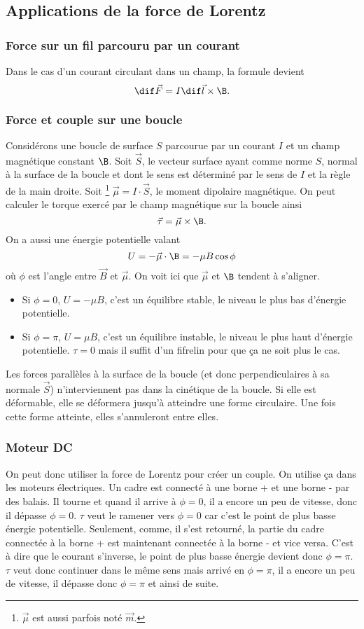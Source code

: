 \subsection{Applications de la force de Lorentz}
\subsubsection{Force sur un fil parcouru par un courant}
Dans le cas d'un courant circulant dans un champ, la formule devient
\[ \dif \vec F = I\dif \vec l \times \B. \]

\subsubsection{Force et couple sur une boucle}
Considérons une boucle de surface $S$ parcourue par un courant $I$
et un champ magnétique constant $\B$.
Soit $\vec S$, le vecteur surface ayant comme norme $S$,
normal à la surface de la boucle et dont le sens est déterminé
par le sens de $I$ et la règle de la main droite.
Soit
\footnote{$\vec \mu$ est aussi parfois noté $\vec m$.}
$\vec \mu = I \cdot \vec S$,
le moment dipolaire magnétique.
On peut calculer le torque exercé par le champ magnétique sur la boucle ainsi
\[ \vec \tau = \vec \mu \times \B. \]
On a aussi une énergie potentielle valant
\[ U = -\vec \mu \cdot \B = -\mu B \cos \phi \]
où $\phi$ est l'angle entre $\vec{B}$ et $\vec{\mu}$.
On voit ici que $\vec \mu$ et $\B$ tendent à s'aligner.
\begin{itemize}
  \item Si $\phi = 0$, $U = - \mu B$, c'est un équilibre stable,
    le niveau le plus bas d'énergie potentielle.
  \item Si $\phi = \pi$, $U = \mu B$, c'est un équilibre instable,
    le niveau le plus haut d'énergie potentielle.
    $\tau = 0$ mais il suffit d'un fifrelin pour que ça ne soit plus le cas.
\end{itemize}

Les forces parallèles à la surface de la boucle
(et donc perpendiculaires à sa normale $\vec{S}$) n'interviennent pas
dans la cinétique de la boucle.
Si elle est déformable,
elle se déformera jusqu'à atteindre une forme circulaire.
Une fois cette forme atteinte, elles s'annuleront entre elles.

\subsubsection{Moteur DC}
On peut donc utiliser la force de Lorentz pour créer un couple.
On utilise ça dans les moteurs électriques.
Un cadre est connecté à une borne + et une borne - par des balais.
Il tourne et quand il arrive à $\phi = 0$, il a encore un peu de vitesse,
donc il dépasse $\phi = 0$.
$\tau$ veut le ramener vers $\phi = 0$
car c'est le point de plus basse énergie potentielle.
Seulement, comme, il s'est retourné,
la partie du cadre connectée à la borne + est
maintenant connectée à la borne - et vice versa.
C'est à dire que le courant s'inverse,
le point de plus basse énergie devient donc $\phi = \pi$.
$\tau$ veut donc continuer dans le même sens mais arrivé en $\phi = \pi$,
il a encore un peu de vitesse, il dépasse donc $\phi = \pi$ et ainsi de suite.


